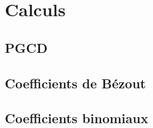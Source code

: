 \documentclass[8pt]{article}
\begin{document}
    \section{Calculs}
        \subsection{PGCD}
        {\scriptsize}
        \subsection{Coefficients de Bézout}
        {\scriptsize}
        \subsection{Coefficients binomiaux}
        {\scriptsize}
\end{document}
